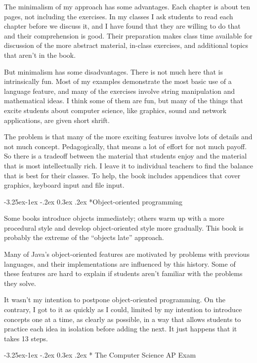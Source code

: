 \documentclass{book}
\makeatletter
\renewcommand\subsection{\@startsection {subsection}{2}{0mm}%
    {-3.25ex\@plus -1ex \@minus -.2ex}%
    {0.3ex \@plus .2ex}%
    {\normalfont\large\bfseries}}
\makeatother
\begin{document}
The minimalism of my approach has some advantages.
Each chapter is about ten pages, not including the exercises.
In my classes I ask students to read each chapter before we
discuss it, and I have found that they are willing to do that
and their comprehension is good.  Their preparation makes
class time available for discussion of the more abstract material,
in-class exercises, and additional topics that aren't in the
book.

But minimalism has some disadvantages.  There is not much here
that is intrinsically fun.  Most of my examples demonstrate the
most basic use of a language feature, and many of the exercises
involve string manipulation and mathematical ideas.  I think some
of them are fun, but many of the things that excite students
about computer science, like graphics, sound and network applications,
are given short shrift.

The problem is that many of the more exciting features involve
lots of details and not much concept.  Pedagogically, that means
a lot of effort for not much payoff.  So there is a tradeoff between
the material that students enjoy and the material that is most
intellectually rich.  I leave it to individual teachers to find
the balance that is best for their classes.  To help, the book
includes appendices that cover graphics, keyboard input and
file input.

\subsection*{Object-oriented programming}

Some books introduce objects immediately;
others warm up with a more procedural style and develop
object-oriented style more gradually.  This book is probably
the extreme of the ``objects late'' approach.

Many of Java's object-oriented features are motivated
by problems with previous languages, and their implementations
are influenced by this history.  Some of these features are
hard to explain if students aren't familiar with the problems
they solve.

It wasn't my intention to postpone object-oriented programming.
On the contrary, I got to it as quickly as I could, limited by
my intention to introduce concepts one at a time, as clearly
as possible, in a way that allows students to practice each
idea in isolation before adding the next.  It just happens
that it takes 13 steps.

\subsection* {The Computer Science AP Exam}
\end{document}
